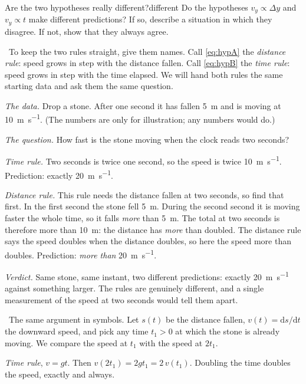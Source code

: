 \documentclass[11pt,twoside,openany]{book}
\newcommand{\dd}{\mathrm{d}}
\newcommand{\viewtag}[3]{\fcolorbox{#2}{#3}{\footnotesize\textbf{\textcolor{#2}{#1}}}}
\newcommand{\elemtag}{\viewtag{Elementary}{elemcol}{elempale}}
\newcommand{\calctag}{\viewtag{Calculus}{calccol}{calcpale}}
\newcommand{\elem}{\par\medskip\noindent\elemtag\ }
\newcommand{\calc}{\par\medskip\noindent\calctag\ }
\begin{document}
\begin{example}{Are the two hypotheses really different?}{different}
Do the hypotheses $v_y \propto \Delta y$ and $v_y \propto t$ make different predictions? If so, describe a situation in which they disagree. If not, show that they always agree.

\elem To keep the two rules straight, give them names. Call \eqref{eq:hypA} the \emph{distance rule}: speed grows in step with the distance fallen. Call \eqref{eq:hypB} the \emph{time rule}: speed grows in step with the time elapsed. We will hand both rules the same starting data and ask them the same question.

\smallskip\noindent\emph{The data.} Drop a stone. After one second it has fallen \SI{5}{\metre} and is moving at \SI{10}{\metre\per\second}. (The numbers are only for illustration; any numbers would do.)

\smallskip\noindent\emph{The question.} How fast is the stone moving when the clock reads two seconds?

\smallskip\noindent\emph{Time rule.} Two seconds is twice one second, so the speed is twice \SI{10}{\metre\per\second}. Prediction: exactly \SI{20}{\metre\per\second}.

\smallskip\noindent\emph{Distance rule.} This rule needs the distance fallen at two seconds, so find that first. In the first second the stone fell \SI{5}{\metre}. During the second second it is moving faster the whole time, so it falls \emph{more} than \SI{5}{\metre}. The total at two seconds is therefore more than \SI{10}{\metre}: the distance has \emph{more} than doubled. The distance rule says the speed doubles when the distance doubles, so here the speed more than doubles. Prediction: \emph{more than} \SI{20}{\metre\per\second}.

\smallskip\noindent\emph{Verdict.} Same stone, same instant, two different predictions: exactly \SI{20}{\metre\per\second} against something larger. The rules are genuinely different, and a single measurement of the speed at two seconds would tell them apart.

\calc The same argument in symbols. Let $s(t)$ be the distance fallen, $v(t) = \dd s/\dd t$ the downward speed, and pick any time $t_1 > 0$ at which the stone is already moving. We compare the speed at $t_1$ with the speed at $2t_1$.

\smallskip\noindent\emph{Time rule}, $v = gt$. Then $v(2t_1) = 2gt_1 = 2\,v(t_1)$. Doubling the time doubles the speed, exactly and always.


\end{example}
\end{document}
